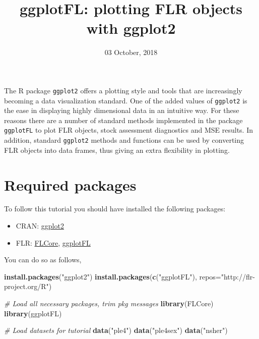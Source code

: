 \documentclass[]{article}
\title{ggplotFL: plotting FLR objects with ggplot2}
\author{}
\date{03 October, 2018}
\newenvironment{Shaded}{\begin{snugshade}}{\end{snugshade}}
\newcommand{\KeywordTok}[1]{\textcolor[rgb]{0.13,0.29,0.53}{\textbf{{#1}}}}
\newcommand{\DataTypeTok}[1]{\textcolor[rgb]{0.13,0.29,0.53}{{#1}}}
\newcommand{\StringTok}[1]{\textcolor[rgb]{0.31,0.60,0.02}{{#1}}}
\newcommand{\CommentTok}[1]{\textcolor[rgb]{0.56,0.35,0.01}{\textit{{#1}}}}
\newcommand{\NormalTok}[1]{{#1}}
\providecommand{\tightlist}{%
  \setlength{\itemsep}{0pt}\setlength{\parskip}{0pt}}
\begin{document}
\maketitle

The R package \texttt{ggplot2} offers a plotting style and tools that
are increasingly becoming a data visualization standard. One of the
added values of \texttt{ggplot2} is the ease in displaying highly
dimensional data in an intuitive way. For these reasons there are a
number of standard methods implemented in the package \texttt{ggplotFL}
to plot FLR objects, stock assessment diagnostics and MSE results. In
addition, standard \texttt{ggplot2} methods and functions can be used by
converting FLR objects into data frames, thus giving an extra
flexibility in plotting.

\section{Required packages}\label{required-packages}

To follow this tutorial you should have installed the following
packages:

\begin{itemize}
\tightlist
\item
  CRAN:
  \href{https://cran.r-project.org/web/packages/ggplot2/index.html}{ggplot2}
\item
  FLR: \href{http://www.flr-project.org/FLCore/}{FLCore},
  \href{http://www.flr-project.org/ggplotFL/}{ggplotFL}
\end{itemize}

You can do so as follows,

\begin{Shaded}
\begin{Highlighting}[]
\KeywordTok{install.packages}\NormalTok{(}\StringTok{"ggplot2"}\NormalTok{)}
\KeywordTok{install.packages}\NormalTok{(}\KeywordTok{c}\NormalTok{(}\StringTok{"ggplotFL"}\NormalTok{), }\DataTypeTok{repos=}\StringTok{"http://flr-project.org/R"}\NormalTok{)}
\end{Highlighting}
\end{Shaded}

\begin{Shaded}
\begin{Highlighting}[]
\CommentTok{# Load all necessary packages, trim pkg messages}
\KeywordTok{library}\NormalTok{(FLCore)}
\KeywordTok{library}\NormalTok{(ggplotFL)}

\CommentTok{# Load datasets for tutorial}
\KeywordTok{data}\NormalTok{(}\StringTok{"ple4"}\NormalTok{)}
\KeywordTok{data}\NormalTok{(}\StringTok{"ple4sex"}\NormalTok{)}
\KeywordTok{data}\NormalTok{(}\StringTok{"nsher"}\NormalTok{)}
\end{Highlighting}
\end{Shaded}
\end{document}
